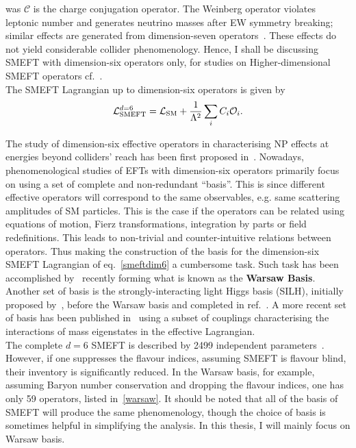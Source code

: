 was $ \mathcal{C}$ is the charge conjugation operator. The Weinberg operator violates leptonic number and generates neutrino masses after EW symmetry breaking; similar effects are generated from dimension-seven operators~\cite{Lehman:2014jma}. These effects do not yield considerable collider phenomenology. Hence, I shall be discussing SMEFT with dimension-six operators only, for studies on Higher-dimensional SMEFT operators cf.~\cite{Lehman:2014jma,Lehman:2015coa,Henning:2015alf,Aguilar-Saavedra:2010uur}. \\ The SMEFT Lagrangian up to dimension-six operators is given by
\begin{equation}
	\mathcal{L}_{\mathrm{SMEFT}}^{d=6}=\mathcal{L}_{\mathrm{SM}} + \frac{1}{\Lambda^2}\sum_i C_i  {\cal O}_i.
	\label{smeftdim6}
\end{equation}

The study of dimension-six effective operators in characterising NP effects at energies beyond colliders’ reach has been first proposed in~\cite{BUCHMULLER1986621,Hagiwara:1993ck}. Nowadays,  phenomenological studies of EFTs with dimension-six operators primarily focus on using a set of complete and non-redundant ``basis''. This is since different effective operators will correspond to the same observables, e.g. same scattering amplitudes of SM particles.  This is the case if the operators can be related using equations of motion, Fierz transformations, integration by parts or field redefinitions. This leads to non-trivial and counter-intuitive relations between operators. Thus making the construction of the basis for the dimension-six SMEFT Lagrangian of eq.~\eqref{smeftdim6} a cumbersome task. Such task has been accomplished by~\cite{Grzadkowski:2010es} recently forming what is known as the \textbf{Warsaw Basis}.  Another set of basis is the strongly-interacting light Higgs basis (SILH), initially proposed by~\cite{Giudice:2007fh}, before the Warsaw basis and completed in ref.~\cite{Contino:2013kra, Elias-Miro:2013eta}. A more recent set of basis has been published in~\cite{Gupta:2014rxa} using a subset of couplings characterising the interactions of mass eigenstates in the effective Lagrangian.\\
The complete $d=6$ SMEFT is described by 2499 independent parameters~\cite{Jenkins:2013zjaJenkins:2013wua,Alonso:2013hga}. However, if one suppresses the flavour indices, assuming SMEFT is flavour blind, their inventory is significantly reduced. In the Warsaw basis, for example, assuming Baryon number conservation and dropping the flavour indices, one has only 59 operators, listed in~\autoref{warsaw}. It should be noted that all of the basis of SMEFT will produce the same phenomenology, though the choice of basis is sometimes helpful in simplifying the analysis. In this thesis, I will mainly focus on Warsaw basis.\\ 
